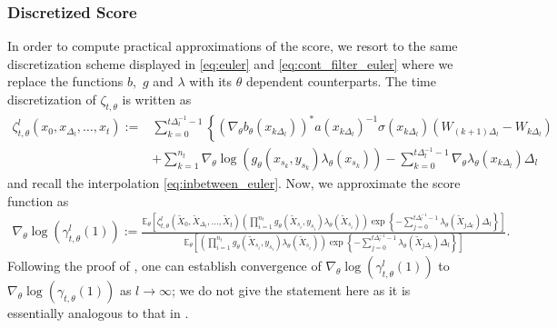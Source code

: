 \documentclass[english]{article}
\begin{document}
\subsubsection{Discretized Score}


In order to compute practical approximations of the score, we resort to the same discretization scheme displayed in \eqref{eq:euler} and \eqref{eq:cont_filter_euler} where we replace the functions $b,$ $g$ and $\lambda$ with its $\theta$ dependent counterparts. The time discretization of $\zeta_{t,\theta}$ is written as
\begin{align*}
\zeta_{t, \theta}^l\left(x_0, x_{\Delta_l}, \ldots, x_t\right):=&\sum_{k=0}^{t\Delta_l^{-1}-1}\left\{\left(\nabla_\theta b_\theta\left(x_{k \Delta_l}\right)\right)^* a\left(x_{k \Delta_l}\right)^{-1} \sigma\left(x_{k \Delta_l}\right)\left(W_{(k+1) \Delta_l}-W_{k \Delta_l}\right)\right.\\
&+\sum_{k=1}^{n_t}\nabla_\theta \log\left( g_{\theta}(x_{s_k},y_{s_k})\lambda_{\theta}(x_{s_k})\right)-\sum_{k=0}^{t\Delta_l^{-1}-1} \nabla_\theta \lambda_\theta(x_{k\Delta_l})\Delta_l
\end{align*}
and recall the interpolation \eqref{eq:inbetween_euler}. Now, we approximate the score function as 
\begin{align*}
\nabla_\theta \log \left(\gamma_{t, \theta}^l(1)\right):=\frac{{\mathbb{E}}_\theta\left[\zeta_{t, \theta}^l\left(\widetilde{X}_0, \widetilde{X}_{\Delta_l}, \ldots, \widetilde{X}_t\right)\left(\prod_{i=1}^{n_t} g_{\theta}(\widetilde{X}_{s_i},y_{s_i})\lambda_{\theta}(\widetilde{X}_{s_i})\right)\exp\left\{-\sum_{j=0}^{t\Delta_l^{-1}-1} \lambda_{\theta}(\widetilde{X}_{j\Delta_l})\Delta_l\right\}\right] }{{\mathbb{E}}_\theta\left[  \left(\prod_{i=1}^{n_t} g_{\theta}(\widetilde{X}_{s_i},y_{s_i})\lambda_{\theta}(\widetilde{X}_{s_i})\right)\exp\left\{-\sum_{j=0}^{t\Delta_l^{-1}-1} \lambda_{\theta}(\widetilde{X}_{j\Delta_l})\Delta_l\right\}   \right]}.
\end{align*}
Following the proof of \cite[Appendix B]{beskos}, one can establish convergence of $\nabla_\theta \log \left(\gamma_{t, \theta}^l(1)\right)$ to $\nabla_\theta \log \left(\gamma_{t, \theta}(1)\right)$ as $l\rightarrow\infty$; we do not give the statement here as it is essentially analogous to that in \cite{beskos}.
\end{document}
